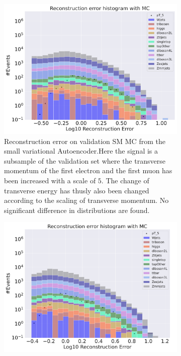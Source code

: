 \begin{figure}[h!]
    \centering
    \begin{subfigure}{.45\textwidth}
        \includegraphics[width=\textwidth]{Figures/VAE_testing/small/b_data_recon_big_rm3_feats_sig_pT_5.pdf}
        \caption{Reconstruction error on validation SM MC from the small variational Autoencoder.Here the signal is a subsample of the validation 
        set where the transverse momentum of the first electron and the first muon has been increased with a scale of $5$. The change of transverse 
        energy has thusly also been changed according to the scaling of transverse momentum.  No significant difference in distributions are found. }
        \label{fig:VAE_small_pt_5}
    \end{subfigure}
    \hfill 
    \begin{subfigure}{.45\textwidth}
        \includegraphics[width=\textwidth]{Figures/VAE_testing/big/b_data_recon_big_rm3_feats_sig_pT_5.pdf}

\end{subfigure}
\end{figure}
